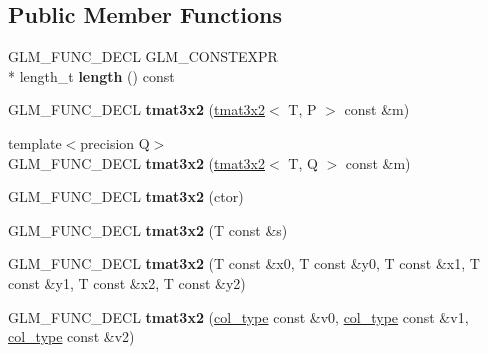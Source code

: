 \subsection*{Public Member Functions}
\begin{DoxyCompactItemize}
\item 
\hypertarget{structglm_1_1detail_1_1tmat3x2_a94cfff914769606a6ecad275a1b4bb46}{G\-L\-M\-\_\-\-F\-U\-N\-C\-\_\-\-D\-E\-C\-L G\-L\-M\-\_\-\-C\-O\-N\-S\-T\-E\-X\-P\-R \\*
length\-\_\-t {\bfseries length} () const }\label{structglm_1_1detail_1_1tmat3x2_a94cfff914769606a6ecad275a1b4bb46}

\item 
\hypertarget{structglm_1_1detail_1_1tmat3x2_ad4a1aebc83113727a6ff015cf870fbf3}{G\-L\-M\-\_\-\-F\-U\-N\-C\-\_\-\-D\-E\-C\-L {\bfseries tmat3x2} (\hyperlink{structglm_1_1detail_1_1tmat3x2}{tmat3x2}$<$ T, P $>$ const \&m)}\label{structglm_1_1detail_1_1tmat3x2_ad4a1aebc83113727a6ff015cf870fbf3}

\item 
\hypertarget{structglm_1_1detail_1_1tmat3x2_a293a68738c817050bcccf356d1c36171}{{\footnotesize template$<$precision Q$>$ }\\G\-L\-M\-\_\-\-F\-U\-N\-C\-\_\-\-D\-E\-C\-L {\bfseries tmat3x2} (\hyperlink{structglm_1_1detail_1_1tmat3x2}{tmat3x2}$<$ T, Q $>$ const \&m)}\label{structglm_1_1detail_1_1tmat3x2_a293a68738c817050bcccf356d1c36171}

\item 
\hypertarget{structglm_1_1detail_1_1tmat3x2_a370b3101c031c0789fe0a6fb33f5c13a}{G\-L\-M\-\_\-\-F\-U\-N\-C\-\_\-\-D\-E\-C\-L {\bfseries tmat3x2} (ctor)}\label{structglm_1_1detail_1_1tmat3x2_a370b3101c031c0789fe0a6fb33f5c13a}

\item 
\hypertarget{structglm_1_1detail_1_1tmat3x2_ab469e328c7d856fc0b999e9bc3c512e8}{G\-L\-M\-\_\-\-F\-U\-N\-C\-\_\-\-D\-E\-C\-L {\bfseries tmat3x2} (T const \&s)}\label{structglm_1_1detail_1_1tmat3x2_ab469e328c7d856fc0b999e9bc3c512e8}

\item 
\hypertarget{structglm_1_1detail_1_1tmat3x2_a680eecd8662a43d6f873da7c2577e7a2}{G\-L\-M\-\_\-\-F\-U\-N\-C\-\_\-\-D\-E\-C\-L {\bfseries tmat3x2} (T const \&x0, T const \&y0, T const \&x1, T const \&y1, T const \&x2, T const \&y2)}\label{structglm_1_1detail_1_1tmat3x2_a680eecd8662a43d6f873da7c2577e7a2}

\item 
\hypertarget{structglm_1_1detail_1_1tmat3x2_af83457c3dde2ca170e71eed84c60338c}{G\-L\-M\-\_\-\-F\-U\-N\-C\-\_\-\-D\-E\-C\-L {\bfseries tmat3x2} (\hyperlink{structglm_1_1detail_1_1tvec2}{col\-\_\-type} const \&v0, \hyperlink{structglm_1_1detail_1_1tvec2}{col\-\_\-type} const \&v1, \hyperlink{structglm_1_1detail_1_1tvec2}{col\-\_\-type} const \&v2)}\label{structglm_1_1detail_1_1tmat3x2_af83457c3dde2ca170e71eed84c60338c}


\end{DoxyCompactItemize}
